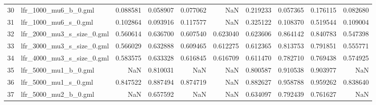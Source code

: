 \begin{tabular}{llrrrrrrrr}
30 &        lfr\_1000\_mu6\_b\_0.gml &                            0.088581 &                       0.058907 &                          0.077062 &                           NaN &                        0.219233 &                     0.057365 &                            0.176115 &                                0.082680 \\
31 &        lfr\_1000\_mu6\_s\_0.gml &                            0.102864 &                       0.093916 &                          0.117577 &                           NaN &                        0.325122 &                     0.108370 &                            0.519544 &                                0.109004 \\
32 &   lfr\_2000\_mu3\_s\_size\_0.gml &                            0.560614 &                       0.636700 &                          0.607540 &                      0.623040 &                        0.623606 &                     0.864142 &                            0.840783 &                                0.547398 \\
33 &   lfr\_3000\_mu3\_s\_size\_0.gml &                            0.566029 &                       0.632888 &                          0.609465 &                      0.612275 &                        0.612365 &                     0.813753 &                            0.791851 &                                0.555771 \\
34 &   lfr\_4000\_mu3\_s\_size\_0.gml &                            0.583575 &                       0.633328 &                          0.616845 &                      0.616709 &                        0.611470 &                     0.782710 &                            0.769438 &                                0.574925 \\
35 &        lfr\_5000\_mu1\_b\_0.gml &                                 NaN &                       0.810031 &                               NaN &                           NaN &                        0.800587 &                     0.910538 &                            0.903977 &                                     NaN \\
36 &        lfr\_5000\_mu1\_s\_0.gml &                            0.847522 &                       0.887494 &                          0.874719 &                           NaN &                        0.882627 &                     0.958788 &                            0.959262 &                                0.838640 \\
37 &        lfr\_5000\_mu2\_b\_0.gml &                                 NaN &                       0.657592 &                               NaN &                           NaN &                        0.634097 &                     0.792439 &                            0.761627 &                                     NaN \\

\end{tabular}

